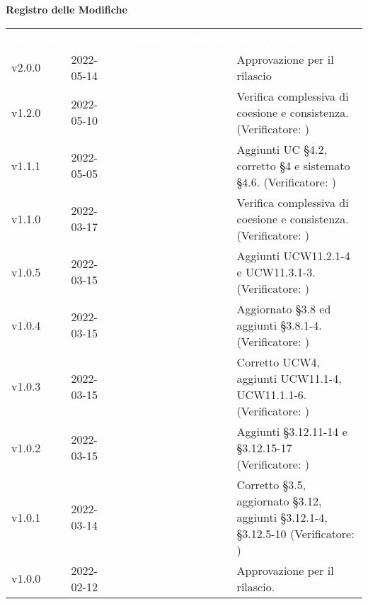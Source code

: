 
{\LARGE{\textbf{Registro delle Modifiche}}} \\
\renewcommand{\arraystretch}{1.5}
\begin{longtable}{ m{}<{\centering}  m{}<{\centering}  m{}<{\centering}  m{}<{\centering}  m{}<{\centering} }
	\rowcolor{darkblue}
	\textcolor{white}{\textbf{Versione}} &\textcolor{white}{\textbf{Data}}& \textcolor{white}{\textbf{Nominativo}} & \textcolor{white}{\textbf{Ruolo}}&\textcolor{white}{\textbf{Descrizione}}\\ 

	v2.0.0 & 2022-05-14 & \MG & \RE & Approvazione per il rilascio \\

	v1.2.0 & 2022-05-10 & \GC & \AN & Verifica complessiva di coesione e consistenza. (Verificatore: \textit{\PV}) \\

	v1.1.1 & 2022-05-05& \GC & \AN{} & Aggiunti UC \S{}4.2, corretto \S{}4 e sistemato \S{}4.6. (Verificatore: \textit{\PV})  \\	

	v1.1.0 & 2022-03-17 & \FP & \AN & Verifica complessiva di coesione e consistenza. (Verificatore: \textit{\PV}) \\	

	v1.0.5 & 2022-03-15& \LW & \AN{} & Aggiunti UCW11.2.1-4 e UCW11.3.1-3. (Verificatore: \textit{\PV})  \\

	v1.0.4 & 2022-03-15& \FP & \AN{} & Aggiornato \S{}3.8 ed aggiunti \S{}3.8.1-4. (Verificatore: \textit{\PV})  \\

	v1.0.3 & 2022-03-15& \GC & \AN{} & Corretto UCW4, aggiunti UCW11.1-4, UCW11.1.1-6. (Verificatore: \textit{\PV})  \\

	v1.0.2 & 2022-03-15& \LW & \AN{} & Aggiunti \S{}3.12.11-14 e \S{}3.12.15-17 (Verificatore: \textit{\PV})  \\

	v1.0.1 & 2022-03-14& \GC & \AN{} & Corretto \S{}3.5, aggiornato \S{}3.12, aggiunti \S{}3.12.1-4, \S{}3.12.5-10 (Verificatore: \textit{\PV})  \\
	
	v1.0.0& 2022-02-12& \EP{} &  \RE{}  & Approvazione per il rilascio. \\


\end{longtable}
